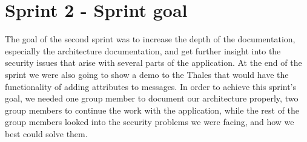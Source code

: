 \section{Sprint 2 - Sprint goal}
The goal of the second sprint was to increase the depth of the documentation, especially the architecture documentation, and get further insight into the security issues that arise with several parts of the application. 
\newline
\newline
At the end of the sprint we were also going to show a demo to the Thales that would have the functionality of adding attributes to messages. 
\newline
\newline
In order to achieve this sprint’s goal, we needed one group member to document our architecture properly, two group members to continue the work with the application, while the rest of the group members looked into the security problems we were facing, and how we best could solve them.